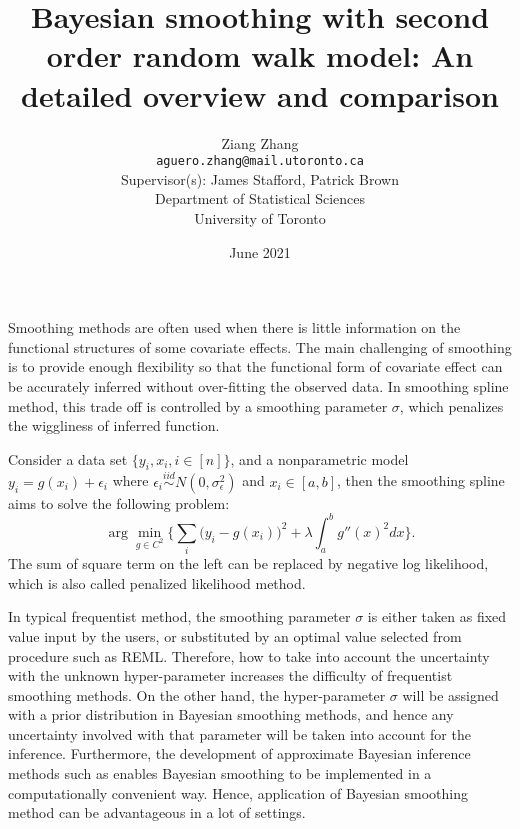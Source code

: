 \documentclass{article}
\title{\textbf{Bayesian smoothing with second order random walk model: An detailed overview and comparison}}
\author{
Ziang Zhang \\ \vspace{-0.3cm}\normalsize\texttt{aguero.zhang@mail.utoronto.ca}\\ 
\large
\vspace{0.5cm}
Supervisor(s): James Stafford, Patrick Brown \\ 

\vspace{0.5cm}
Department of Statistical Sciences \\
University of Toronto
}
\date{June 2021}
\begin{document}
\maketitle

\tableofcontents

\newpage

Smoothing methods are often used when there is little information on the functional structures of some covariate effects. The main challenging of smoothing is to provide enough flexibility so that the functional form of covariate effect can be accurately inferred without over-fitting the observed data. In smoothing spline method, this trade off is controlled by a smoothing parameter $\sigma$, which penalizes the wiggliness of inferred function.

Consider a data set $\{y_i,x_i, i\in [n]\}$, and a nonparametric model $y_i = g(x_i) + \epsilon_i$ where $\epsilon_i \overset{iid}\sim N(0,\sigma_\epsilon^2)$ and $x_i \in [a,b]$, then the smoothing spline aims to solve the following problem:
$$\arg\min_{g\in C^2} \bigg\{ \sum_i\bigg(y_i-g(x_i)\bigg)^2 + \lambda\int_a^b g''(x)^2 dx \bigg\}.$$
The sum of square term on the left can be replaced by negative log likelihood, which is also called penalized likelihood method.

In typical frequentist method, the smoothing parameter $\sigma$ is either taken as fixed value input by the users, or substituted by an optimal value selected from procedure such as REML. Therefore, how to take into account the uncertainty with the unknown hyper-parameter increases the difficulty of frequentist smoothing methods. On the other hand, the hyper-parameter $\sigma$ will be assigned with a prior distribution in Bayesian smoothing methods, and hence any uncertainty involved with that parameter will be taken into account for the inference. Furthermore, the development of approximate Bayesian inference methods such as \cite{inla} enables Bayesian smoothing to be implemented in a computationally convenient way. Hence, application of Bayesian smoothing method can be advantageous in a lot of settings.
\end{document}
